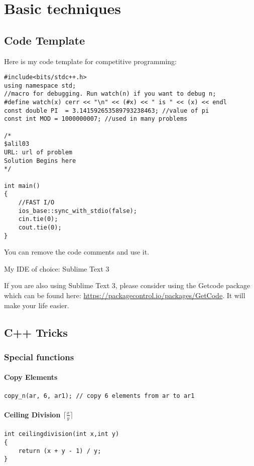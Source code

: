 \documentclass[twoside,12pt,a4paper,english]{book}
\theoremstyle{definition}
\theoremstyle{problemstyle}
\theoremstyle{problemstyle}
\theoremstyle{problemstyle}
\begin{document}
\part{Basic techniques}

\chapter{Code Template}

Here is my code template for competitive programming:

\begin{lstlisting}
#include<bits/stdc++.h>
using namespace std;
//macro for debugging. Run watch(n) if you want to debug n;
#define watch(x) cerr << "\n" << (#x) << " is " << (x) << endl
const double PI  = 3.141592653589793238463; //value of pi
const int MOD = 1000000007; //used in many problems

/*
$alil03
URL: url of problem
Solution Begins here
*/

int main()
{
    //FAST I/O
	ios_base::sync_with_stdio(false);
	cin.tie(0);
	cout.tie(0);
}
\end{lstlisting}

You can remove the code comments and use it.

My IDE of choice: Sublime Text 3

If you are also using Sublime Text 3, please consider using the Getcode package which can be found here: \url{https://packagecontrol.io/packages/GetCode}. It will make your life easier.
\chapter{C++ Tricks}

\section{Special functions}
\subsection{Copy Elements}
\begin{lstlisting}
copy_n(ar, 6, ar1); // copy 6 elements from ar to ar1
\end{lstlisting}
\subsection{Ceiling Division \texorpdfstring{$\lceil \frac{x}{y} \rceil$}{}}
\begin{lstlisting}
int ceilingdivision(int x,int y)
{
    return (x + y - 1) / y;
}
\end{lstlisting}
\end{document}
